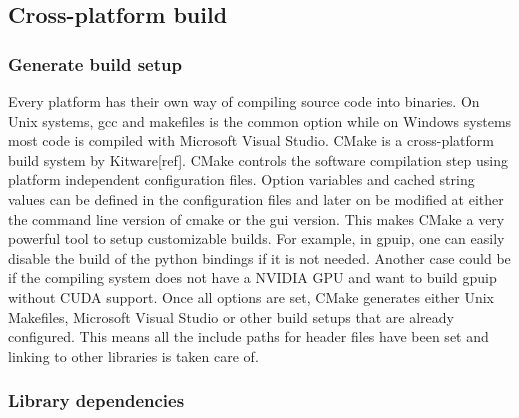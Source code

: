 \subsection{Cross-platform build}
\subsubsection{Generate build setup}
Every platform has their own way of compiling source code into binaries. On Unix systems, gcc and makefiles is the common option while on Windows systems most code is compiled with Microsoft Visual Studio. CMake is a cross-platform build system by Kitware[ref]. CMake controls the software compilation step using platform independent configuration files. Option variables and cached string values can be defined in the configuration files and later on be modified at either the command line version of cmake or the gui version. This makes CMake a very powerful tool to setup customizable builds. For example, in gpuip, one can easily disable the build of the python bindings if it is not needed. Another case could be if the compiling system does not have a NVIDIA GPU and want to build gpuip without CUDA support. Once all options are set, CMake generates either Unix Makefiles, Microsoft Visual Studio or other build setups that are already configured. This means all the include paths for header files have been set and linking to other libraries is taken care of.

\subsubsection{Library dependencies}

